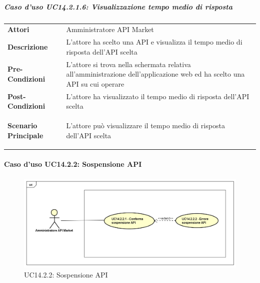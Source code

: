\subparagraph{Caso d'uso UC14.2.1.6: Visualizzazione tempo medio di risposta}
\label{UC14_2_1_6}

\begin{minipage}{\linewidth}
	\begin{tabular}{ l | p{11cm}}
		\hline
		\rowcolor{Gray}
		\multicolumn{2}{c}{UC14.2.1.6 - Visualizzazione tempo medio di risposta} \\
		\hline
		\textbf{Attori} & Amministratore API Market \\
		\textbf{Descrizione} & L'attore ha scelto una API e visualizza il tempo medio di risposta dell'API scelta \\
		\textbf{Pre-Condizioni} & L'attore si trova nella schermata relativa all'amministrazione dell'applicazione web ed ha scelto una API su cui operare \\
		\textbf{Post-Condizioni} & L'attore ha visualizzato il tempo medio di risposta dell'API scelta \\
		\textbf{Scenario Principale} & 
		\begin{enumerate*}[label=(\arabic*.),itemjoin={\newline}]
			\item L'attore può visualizzare il tempo medio di risposta dell'API scelta
		\end{enumerate*}\\
	\end{tabular}
\end{minipage}

\newpage
\paragraph{Caso d'uso UC14.2.2: Sospensione API}
\label{UC14_2_2}
\begin{figure}[ht]
	\centering
	\includegraphics[scale=0.45]{UML/UC14_2_2.png}
	\caption{UC14.2.2: Sospensione API}
\end{figure}

